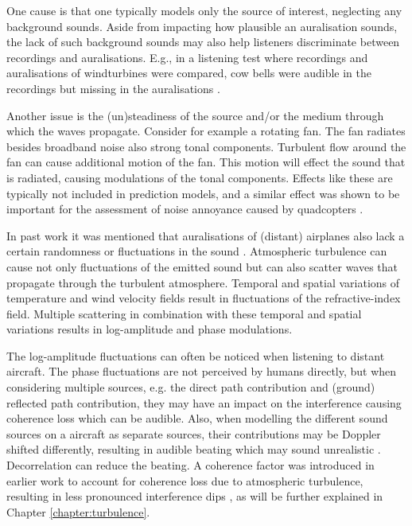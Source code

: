 One cause is that one typically models only the source of interest, neglecting
any background sounds. Aside from impacting how plausible an auralisation
sounds, the lack of such background sounds may also help listeners discriminate
between recordings and auralisations. E.g., in a listening test where recordings
and auralisations of windturbines were compared, cow bells were audible in the
recordings but missing in the auralisations \cite{Pieren2014}.

Another issue is the (un)steadiness of the source and/or
the medium through which the waves propagate. Consider for example a
rotating fan. The fan radiates besides broadband noise also strong tonal
components. Turbulent flow around the fan can cause additional motion of the
fan. This motion will effect the sound that is radiated, causing
modulations of the tonal components. Effects like these are typically not
included in prediction models, and a similar effect was shown to be
important for the assessment of noise annoyance caused by quadcopters
\cite{Rizzi2015}.

In past work it was mentioned that auralisations of (distant) airplanes also
lack a certain randomness or fluctuations in the sound \cite{Arntzen2014a}.
Atmospheric turbulence can cause not only fluctuations of the emitted sound but
can also scatter waves that propagate through the turbulent atmosphere. Temporal
and spatial variations of temperature and wind velocity fields result in
fluctuations of the refractive-index field. Multiple scattering in combination
with these temporal and spatial variations results in log-amplitude and phase
modulations.

The log-amplitude fluctuations can often be noticed when listening to distant
aircraft. The phase fluctuations are not perceived by humans directly, but when
considering multiple sources, e.g. the direct path contribution and (ground)
reflected path contribution, they may have an impact on the interference causing
coherence loss \cite{Daigle1979} which can be audible. Also, when modelling the
different sound sources on a aircraft as separate sources, their contributions
may be Doppler shifted differently, resulting in audible beating which may sound
unrealistic \cite{Rizzi2013}. Decorrelation can reduce the beating. A coherence
factor was introduced in earlier work \cite{Shin2006, Arntzen2014b,
Arntzen2014a} to account for coherence loss due to atmospheric turbulence,
resulting in less pronounced interference dips , as will be further explained in
Chapter \ref{chapter:turbulence}.

